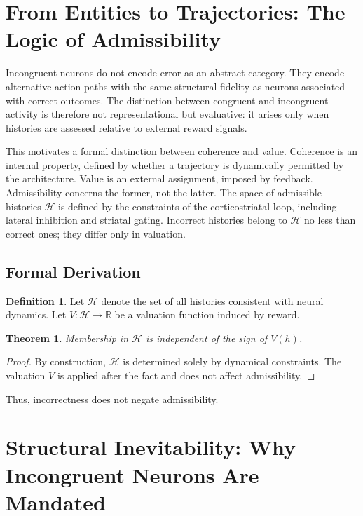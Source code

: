 \documentclass[11pt]{article}
\theoremstyle{plain}
\newtheorem{theorem}{Theorem}
\theoremstyle{definition}
\newtheorem{definition}{Definition}
\begin{document}
\section{From Entities to Trajectories: The Logic of Admissibility}

Incongruent neurons do not encode error as an abstract category. They encode alternative action paths with the same structural fidelity as neurons associated with correct outcomes. The distinction between congruent and incongruent activity is therefore not representational but evaluative: it arises only when histories are assessed relative to external reward signals.

This motivates a formal distinction between coherence and value. Coherence is an internal property, defined by whether a trajectory is dynamically permitted by the architecture. Value is an external assignment, imposed by feedback. Admissibility concerns the former, not the latter. The space of admissible histories $\mathcal{H}$ is defined by the constraints of the corticostriatal loop, including lateral inhibition and striatal gating. Incorrect histories belong to $\mathcal{H}$ no less than correct ones; they differ only in valuation.

\subsection*{Formal Derivation}

\begin{definition}
Let $\mathcal{H}$ denote the set of all histories consistent with neural dynamics. Let $V:\mathcal{H}\to\mathbb{R}$ be a valuation function induced by reward.
\end{definition}

\begin{theorem}
Membership in $\mathcal{H}$ is independent of the sign of $V(h)$.
\end{theorem}

\begin{proof}
By construction, $\mathcal{H}$ is determined solely by dynamical constraints. The valuation $V$ is applied after the fact and does not affect admissibility.
\end{proof}

Thus, incorrectness does not negate admissibility.

\section{Structural Inevitability: Why Incongruent Neurons Are Mandated}
\end{document}

